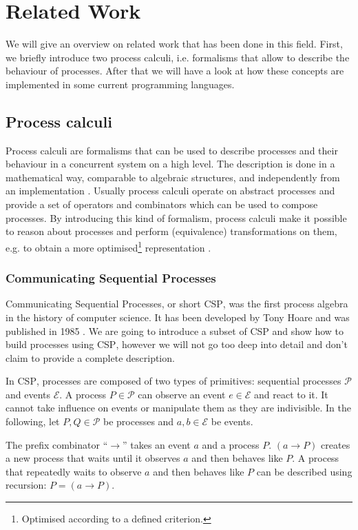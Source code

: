 \chapter{Related Work}
We will give an overview on related work that has been done in this field. First, we briefly introduce two process calculi, i.e. formalisms that allow to describe the behaviour of processes. After that we will have a look at how these concepts are implemented in some current programming languages.

\section{Process calculi}
Process calculi are formalisms that can be used to describe processes and their behaviour in a concurrent system on a high level. The description is done in a mathematical way, comparable to algebraic structures, and independently from an implementation \cite{}. Usually process calculi operate on abstract processes and provide a set of operators and combinators which can be used to compose processes. By introducing this kind of formalism, process calculi make it possible to reason about processes and perform (equivalence) transformations on them, e.g. to obtain a more optimised\footnote{Optimised according to a defined criterion.} representation \cite{}.

\subsection{Communicating Sequential Processes}
Communicating Sequential Processes, or short \textsc{CSP}, was the first process algebra in the history of computer science. It has been developed by Tony Hoare and was published in 1985 \cite{Hoare:1985:CSP:3921}. We are going to introduce a subset of \textsc{CSP} and show how to build processes using \textsc{CSP}, however we will not go too deep into detail and don't claim to provide a complete description.

In \textsc{CSP}, processes are composed of two types of primitives: sequential processes $\mathcal{P}$ and events $\mathcal{E}$. A process $P \in \mathcal{P}$ can observe an event $e \in \mathcal{E}$ and react to it. It cannot take influence on events or manipulate them as they are indivisible. In the following, let $P, Q \in \mathcal{P}$ be processes and $a,b \in \mathcal{E}$ be events.

The prefix combinator \enquote{$\to$} takes an event $a$ and a process $P$. $\left( a \to P \right)$ creates a new process that waits until it observes $a$ and then behaves like $P$. A process that repeatedly waits to observe $a$ and then behaves like $P$ can be described using recursion: $P = \left( a \to P \right)$.

